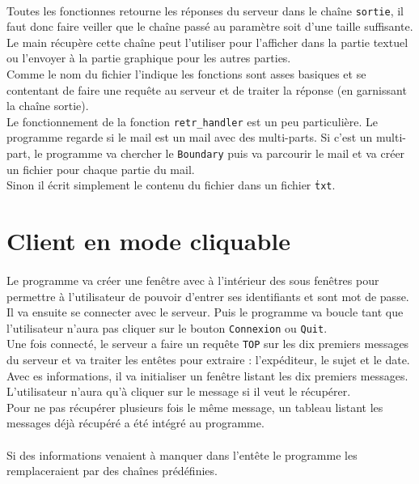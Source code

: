 \documentclass[a4paper, titlepage, oneside, 12pt]{article}%
\begin{document}
\paragraph{}
Toutes les fonctionnes retourne les réponses du serveur dans le chaîne \texttt{sortie}, il faut donc faire veiller que le chaîne passé au paramètre soit d'une taille suffisante.\\
Le main récupère cette chaîne peut l'utiliser pour l'afficher dans la partie textuel ou l'envoyer à la partie graphique pour les autres parties.\\
Comme le nom du fichier l'indique les fonctions sont asses basiques et se contentant de faire une requête au serveur et de traiter la réponse (en garnissant la chaîne sortie).\\
Le fonctionnement de la fonction \texttt{retr\_handler} est un peu particulière. Le programme regarde si le mail est un mail avec des multi-parts. Si c'est un multi-part, le programme va chercher le \texttt{Boundary} puis va parcourir le mail et va créer un fichier pour chaque partie du mail.\\
Sinon il écrit simplement le contenu du fichier dans un fichier \texttt{\.txt}.

\section{Client en mode cliquable}
\paragraph{}
Le programme va créer une fenêtre avec à l’intérieur des sous fenêtres pour permettre à l'utilisateur de pouvoir d'entrer ses identifiants et sont mot de passe.\\
Il va ensuite se connecter avec le serveur. Puis le programme va boucle tant que l'utilisateur n'aura pas cliquer sur le bouton \texttt{Connexion} ou \texttt{Quit}.\\
Une fois connecté, le serveur a faire un requête \texttt{TOP} sur les dix premiers messages du serveur et va traiter les entêtes pour extraire : l’expéditeur, le sujet et le date. Avec es informations, il va initialiser un fenêtre listant les dix premiers messages. L'utilisateur n'aura qu'à cliquer sur le message si il veut le récupérer.\\
Pour ne pas récupérer plusieurs fois le même message, un tableau listant les messages déjà récupéré a été intégré au programme.

\paragraph{}
Si des informations venaient à manquer dans l’entête le programme les remplaceraient par des chaînes prédéfinies. 
\end{document}

